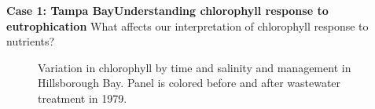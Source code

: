 \documentclass[serif]{beamer}\usepackage[]{graphicx}\usepackage[]{color}
\begin{document}
\begin{frame}{\textbf{Case 1: Tampa Bay}}{\textbf{Understanding chlorophyll response to eutrophication}}
What affects our interpretation of chlorophyll response to nutrients?
\vspace{-0.1in}
\captionsetup[subfloat]{captionskip=0pt, position=top}
\begin{figure}
\centering
{}

\leavevmode{}
    \hspace{0pt plus 1filll}\null

\caption{Variation in chlorophyll by {\color{zissou5}\protect{}} time and {\color{zissou5}\protect{}} salinity and management in Hillsborough Bay.  Panel {\color{zissou5}\protect{}} is colored before and after wastewater treatment in 1979.}
\label{fig:salmoyr}
\end{figure}
\captionsetup[subfloat]{position=top}
\end{frame}
\end{document}
